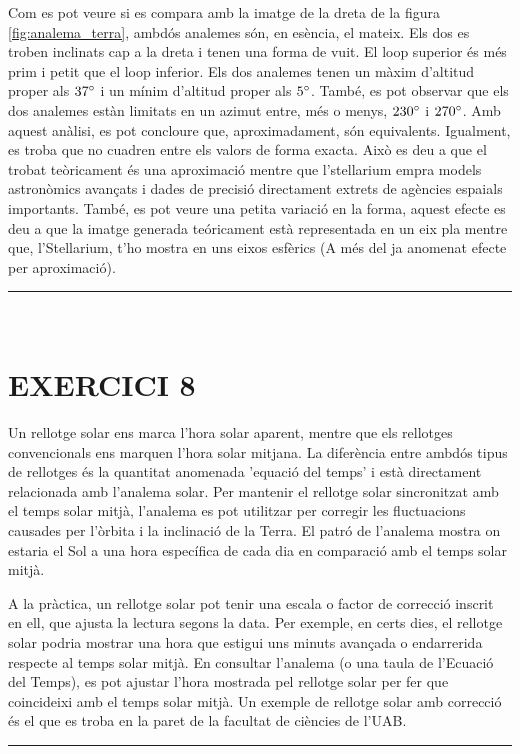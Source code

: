 \documentclass[a4paper, 11pt]{article}
\begin{document}
\noindent Com es pot veure si es compara amb la imatge de la dreta de la figura \ref{fig:analema_terra}, ambdós analemes són, en esència, el mateix. Els dos es troben inclinats cap a la dreta i tenen una forma de vuit. El loop superior és més prim i petit que el loop inferior. Els dos analemes tenen un màxim d'altitud proper als $37 \degree$ i un mínim d'altitud proper als $5 \degree$. També, es pot observar que els dos analemes estàn limitats en un azimut entre, més o menys, $230 \degree$ i $270 \degree$. Amb aquest anàlisi, es pot concloure que, aproximadament, són equivalents. Igualment, es troba que no cuadren entre els valors de forma exacta. Això es deu a que el trobat teòricament és una aproximació mentre que l'stellarium empra models astronòmics avançats i dades de precisió directament extrets de agències espaials importants. També, es pot veure una petita variació en la forma, aquest efecte es deu a que la imatge generada teóricament està representada en un eix pla mentre que, l'Stellarium, t'ho mostra en uns eixos esfèrics (A més del ja anomenat efecte per aproximació).

\vspace{10mm}
\hrule\
\vspace{5mm}


\section*{EXERCICI 8}
\noindent Un rellotge solar ens marca l'hora solar aparent, mentre que els rellotges convencionals ens marquen l'hora solar mitjana. La diferència entre ambdós tipus de rellotges és la quantitat anomenada 'equació del temps' i està directament relacionada amb l'analema solar. Per mantenir el rellotge solar sincronitzat amb el temps solar mitjà, l'analema es pot utilitzar per corregir les fluctuacions causades per l'òrbita i la inclinació de la Terra. El patró de l'analema mostra on estaria el Sol a una hora específica de cada dia en comparació amb el temps solar mitjà.

\vspace{2mm}

\noindent A la pràctica, un rellotge solar pot tenir una escala o factor de correcció inscrit en ell, que ajusta la lectura segons la data. Per exemple, en certs dies, el rellotge solar podria mostrar una hora que estigui uns minuts avançada o endarrerida respecte al temps solar mitjà. En consultar l'analema (o una taula de l'Ecuació del Temps), es pot ajustar l'hora mostrada pel rellotge solar per fer que coincideixi amb el temps solar mitjà. Un exemple de rellotge solar amb correcció és el que es troba en la paret de la facultat de ciències de l'UAB. 
\vspace{10mm}
\hrule\
\vspace{5mm}
\end{document}
